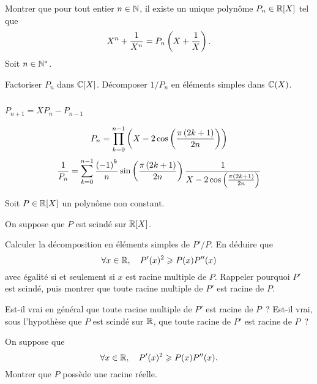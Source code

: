 \documentclass{magnolia}
\begin{document}
\begin{questions}
\question Montrer que pour tout entier $n\in\mathbb{N}$, il existe un unique polynôme
  $P_n\in\polyR$ tel que
  \[X^n+\frac{1}{X^n}=P_n\left(X+\frac{1}{X}\right).\]
\question Soit $n\in{\mathbb{N}^*}$.
  \begin{questions}
  \question Factoriser $P_n$ dans $\polyC$.
  \question Décomposer $1/P_n$ en éléments simples dans $\fracC$.
  \end{questions}
\end{questions}
\begin{sol}
$\quad$
\begin{questions}
\question $P_{n+1}=XP_n-P_{n-1}$
\question
  \begin{questions}
  \question 
    \[P_n=\prod_{k=0}^{n-1} \left(X-2\cos\left(\frac{\pi\left(2k+1\right)}{2n}\right)\right)\]
  \question
    \[\frac{1}{P_n}=\sum_{k=0}^{n-1} \frac{\left(-1\right)^k}{n}\sin\left(\frac{\pi\left(2k+1\right)}{2n}\right)
      \frac{1}{X-2\cos\left(\frac{\pi\left(2k+1\right)}{2n}\right)}\]
  \end{questions}
\end{questions}
\end{sol}



Soit $P\in\polyR$ un polynôme non constant.
\begin{questions}
\question On suppose que $P$ est scindé sur $\polyR$.
\begin{questions}
\question Calculer la décomposition en éléments simples de $P'/P$.
\question En déduire que
  \[\forall x\in\mathbb{R},\quad P'(x)^2\geqslant P(x)P''(x)\]
  avec égalité si et seulement si $x$ est racine multiple de $P$.
\question Rappeler pourquoi $P'$ est scindé, puis montrer que toute
  racine multiple de $P'$ est racine de $P$.
\end{questions}
\question
\begin{questions}
\question Est-il vrai en général que toute racine multiple de $P'$ est racine de $P$~?
\question Est-il vrai, sous l'hypothèse que $P$ est scindé sur $\mathbb{R}$, que toute racine de $P'$ est racine de $P$~?
\end{questions}
\question On suppose que
  \[\forall x\in\mathbb{R},\quad P'(x)^2\geqslant P(x)P''(x).\]
  Montrer que $P$ possède une racine réelle.
\end{questions}
\end{document}
